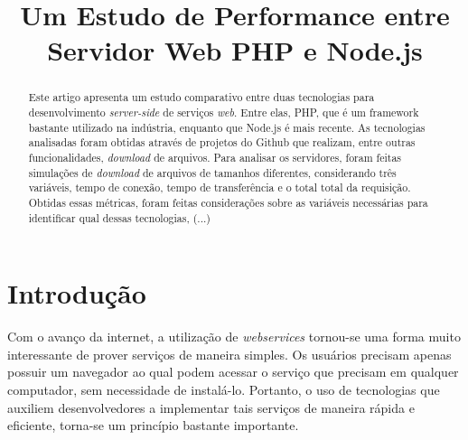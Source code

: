 \documentclass[conference,compsoc]{IEEEtran}
\begin{document}
%
\title{Um Estudo de Performance entre Servidor Web PHP e Node.js}
\label{title}

\author{
}

\maketitle

\label{abstract}
\begin{abstract}
Este artigo apresenta um estudo comparativo entre duas tecnologias para desenvolvimento \textit{server-side} de serviços \textit{web}. Entre elas, PHP, que é um framework bastante utilizado na indústria, enquanto que Node.js é mais recente. As tecnologias analisadas foram obtidas através de projetos do Github que realizam, entre outras funcionalidades, \textit{download} de arquivos. Para analisar os servidores, foram feitas simulações de \textit{download} de arquivos de tamanhos diferentes, considerando três variáveis, tempo de conexão, tempo de transferência e o total total da requisição. Obtidas essas métricas, foram feitas considerações sobre as variáveis necessárias para identificar qual dessas tecnologias, (...)

\end{abstract}

\IEEEpeerreviewmaketitle

\section{Introdução}
\label{introducao}
Com o avanço da internet, a utilização de \textit{webservices} tornou-se uma forma muito interessante de prover serviços de maneira simples. Os usuários precisam apenas possuir um navegador ao qual podem acessar o serviço que precisam em qualquer computador, sem necessidade de instalá-lo. Portanto, o uso de tecnologias que auxiliem desenvolvedores a implementar tais serviços de maneira rápida e eficiente, torna-se um princípio bastante importante.
\end{document}
